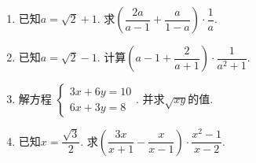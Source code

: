 \documentclass{article}
\begin{document}
\begin{enumerate}
\item 已知$a=\sqrt{2}+1$. 求$\left(\dfrac{2a}{a-1}+\dfrac{a}{1-a}\right)\cdot\dfrac{1}{a}$.
\vspace{15em}

\item 已知$a=\sqrt{2}-1$. 计算$\left( a - 1 + \dfrac{2}{a+1}\right)\cdot\dfrac{1}{a^2+1}$.
\vspace{15em}

\item 解方程 $\begin{cases}
3x+6y=10\\
6x+3y=8
\end{cases}$. 并求$\sqrt{xy}$的值.
\vspace{15em}

\item 已知$x=\dfrac{\sqrt{3}}{2}$. 求$\left(\dfrac{3x}{x+1}-\dfrac{x}{x-1}\right)\cdot\dfrac{x^2-1}{x-2}$.
\end{enumerate}
\end{document}
